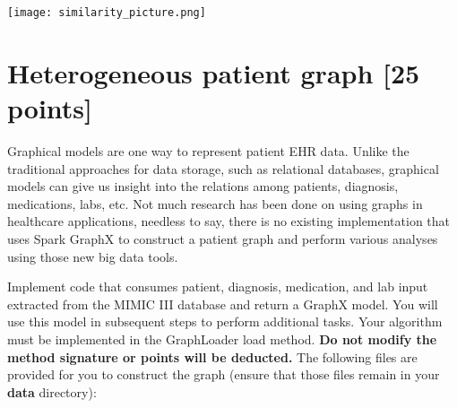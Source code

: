 \documentclass[12pt]{article}
\begin{document}
\texttt{[image: similarity\_picture.png]}

\section{Heterogeneous patient graph [25 points]}

Graphical models are one way to represent patient EHR data. Unlike the traditional approaches for data storage, such as relational databases, graphical models can give us insight into the relations among patients, diagnosis, medications, labs, etc. Not much research has been done on using graphs in healthcare applications, needless to say, there is no existing implementation that uses Spark GraphX to construct a patient graph and perform various analyses using those new big data tools.

Implement code that consumes patient, diagnosis, medication, and lab input extracted from the MIMIC III database and return a GraphX model. You will use this model in subsequent steps to perform additional tasks. Your algorithm must be implemented in the GraphLoader load method. {\textbf{Do not modify the method signature or points will be deducted.}} The following files are provided for you to construct the graph (ensure that those files remain in your \textbf{data} directory):
\end{document}
